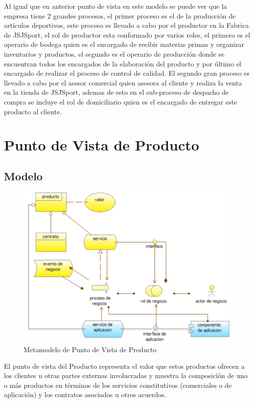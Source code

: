 Al igual que en anterior punto de vista en este modelo se puede ver que la empresa tiene 2 grandes procesos, el primer proceso es el de la producción de artículos deportivos, este proceso es llevado a cabo por el productor en la Fabrica de JSJSport, el rol de productor esta conformado por varios roles, el primero es el operario de bodega quien es el encargado de recibir materias primas y organizar inventarios y productos, el segundo es el operario de producción donde se encuentran todos los encargados de la elaboración del producto y por último el encargado de realizar el proceso de control de calidad.
\newline
El segundo gran proceso es llevado a cabo por el asesor comercial quien asesora al cliente y realiza la venta en la tienda de JSJSport, ademas de esto en el sub-proceso de despacho de compra se incluye el rol de domiciliario quien es el encargado de entregar este producto al cliente.

\newpage

\section{Punto de Vista de Producto}

\subsection{Modelo}
\begin{figure}[th!]
	\centering
	\includegraphics[width=0.5\linewidth]{arquitectura/imagenes/modeloProducto}
	\caption{Metamodelo de Punto de Vista de Producto\cite{pun6}}
	\label{fig:metamodelo de punto de vista de producto}
\end{figure}
El punto de vista del Producto representa el valor que estos productos ofrecen a los clientes u otras partes externas involucradas y muestra la composición de uno o más productos en términos de los servicios constitutivos (comerciales o de aplicación) y los contratos asociados u otros acuerdos.

